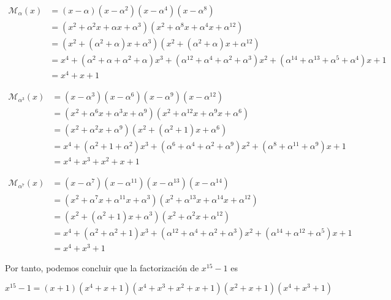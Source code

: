 \begin{exampleth}
 \begin{equation*}
 \begin{split}
 \mathcal{M}_{\alpha}(x) & = (x-\alpha)(x-\alpha^2)(x-\alpha^4)(x-\alpha^8) \\
   & = (x^2 + \alpha^2 x + \alpha x + \alpha^3)(x^2 + \alpha^8 x + \alpha^4 x + \alpha^{12}) \\
  & = (x^2+(\alpha^2 + \alpha) x + \alpha^3)(x^2+(\alpha^2 + \alpha)x + \alpha^{12})  \\
   & = x^4 + (\alpha^2 + \alpha + \alpha^2 + \alpha)x^3 + (\alpha^{12} + \alpha^4 + \alpha^2 + \alpha^3 )x^2 + (\alpha^{14} + \alpha^{13} + \alpha^5 + \alpha^4)x + 1 \\
  & = x^4 + x + 1
 \end{split}
 \end{equation*}
 
 \begin{equation*}
 \begin{split}
 \mathcal{M}_{\alpha^3}(x) & = (x-\alpha^3)(x-\alpha^6)(x-\alpha^9)(x-\alpha^{12}) \\
   & = (x^2 + \alpha^6 x + \alpha^3 x + \alpha^9)(x^2 + \alpha^{12} x + \alpha^9 x + \alpha^6) \\
  & = (x^2+\alpha^2 x + \alpha^9)(x^2+(\alpha^2+1)x + \alpha^6)  \\
   & = x^4 + (\alpha^2 + 1 + \alpha^2)x^3 + (\alpha^6 + \alpha^4 + \alpha^2 + \alpha^9 )x^2 + (\alpha^8 + \alpha^{11} + \alpha^9)x + 1 \\
  & = x^4 + x^3 + x^2 + x + 1
 \end{split}
 \end{equation*}
 
 \begin{equation*}
 \begin{split}
 \mathcal{M}_{\alpha^7}(x) & = (x-\alpha^7)(x-\alpha^{11})(x-\alpha^{13})(x-\alpha^{14}) \\
   & = (x^2 + \alpha^7 x + \alpha^{11} x + \alpha^3)(x^2 + \alpha^{13} x + \alpha^{14} x + \alpha^{12}) \\
  & = (x^2+(\alpha^2+1) x + \alpha^3)(x^2+\alpha^2 x + \alpha^{12})  \\
   & = x^4 + (\alpha^2 + \alpha^2 + 1)x^3 + (\alpha^{12} + \alpha^4 + \alpha^2 + \alpha^3 )x^2 + (\alpha^{14} + \alpha^{12} + \alpha^5)x + 1 \\
  & = x^4 + x^3 + 1
 \end{split}
 \end{equation*}

Por tanto, podemos concluir que la factorización de $x^{15}-1$ es 


\[ 
x^{15}-1=(x+1)(x^4+x+1)(x^4+x^3+x^2+x+1)(x^2+x+1)(x^4+x^3+1)
\] 
  

 \end{exampleth}
 
